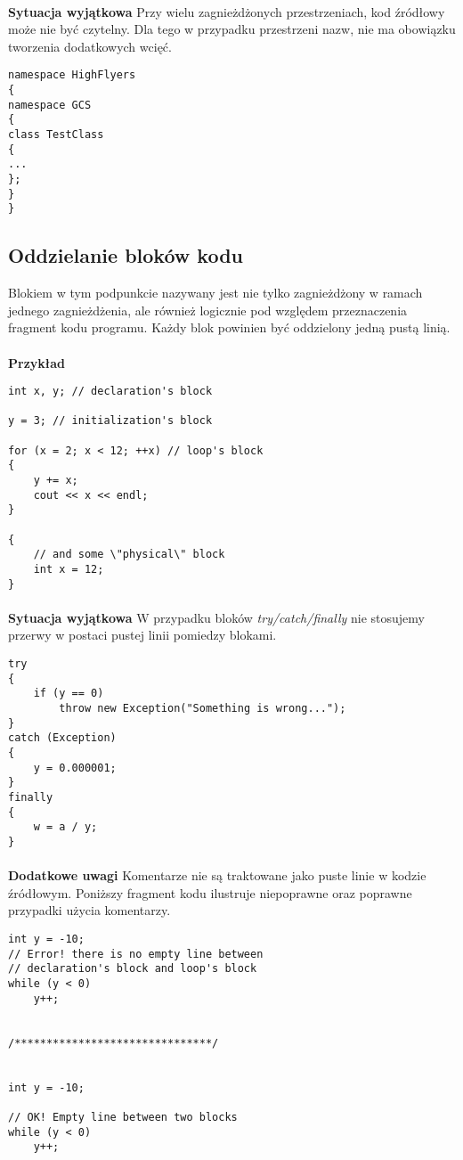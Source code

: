 \documentclass[titlepage]{article}
\begin{document}
\paragraph{}
\textbf{Sytuacja wyjątkowa}
Przy wielu zagnieżdżonych przestrzeniach, kod źródłowy może nie być czytelny. Dla tego w przypadku przestrzeni nazw, nie ma obowiązku tworzenia dodatkowych wcięć.
\begin{lstlisting}
namespace HighFlyers
{
namespace GCS
{
class TestClass
{
...
};
}
}
\end{lstlisting}

\subsection{Oddzielanie bloków kodu}
Blokiem w tym podpunkcie nazywany jest nie tylko zagnieżdżony w ramach jednego zagnieżdżenia, ale również logicznie pod względem przeznaczenia fragment kodu programu. Każdy blok powinien być oddzielony jedną pustą linią.
\paragraph{}
\textbf{Przykład}
\begin{lstlisting}
int x, y; // declaration's block

y = 3; // initialization's block

for (x = 2; x < 12; ++x) // loop's block
{
	y += x;
	cout << x << endl;
}

{
	// and some \"physical\" block
	int x = 12;
}
\end{lstlisting}
\paragraph{}
\textbf{Sytuacja wyjątkowa}
W przypadku bloków \textit{try/catch/finally} nie stosujemy przerwy w postaci pustej linii pomiedzy blokami.
\begin{lstlisting}
try
{
	if (y == 0)
		throw new Exception("Something is wrong...");
}
catch (Exception)
{
	y = 0.000001;
}
finally
{
	w = a / y;
}
\end{lstlisting}
\paragraph{}
\textbf{Dodatkowe uwagi}
Komentarze nie są traktowane jako puste linie w kodzie źródłowym. Poniższy fragment kodu ilustruje niepoprawne oraz poprawne przypadki użycia komentarzy.
\begin{lstlisting}
int y = -10;
// Error! there is no empty line between
// declaration's block and loop's block
while (y < 0)
	y++;


/*******************************/


int y = -10;

// OK! Empty line between two blocks
while (y < 0)
	y++;
\end{lstlisting}
\end{document}
